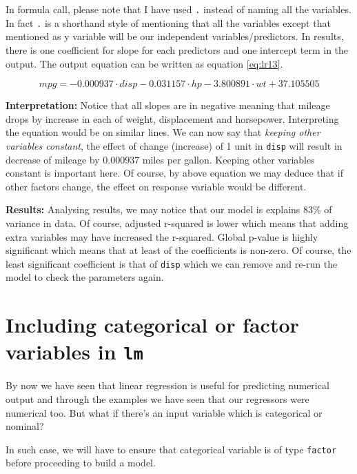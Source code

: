 \documentclass[
]{book}
\begin{document}
In formula call, please note that I have used \texttt{.} instead of naming all the variables. In fact \texttt{.} is a shorthand style of mentioning that all the variables except that mentioned as y variable will be our independent variables/predictors. In results, there is one coefficient for slope for each predictors and one intercept term in the output. The output equation can be written as equation \eqref{eq:lr13}.

\begin{equation} 
{mpg} = -0.000937\cdot{disp} - 0.031157\cdot{hp} - 3.800891\cdot{wt} + 37.105505
\label{eq:lr13}
\end{equation}

\textbf{Interpretation:} Notice that all slopes are in negative meaning that mileage drops by increase in each of weight, displacement and horsepower. Interpreting the equation would be on similar lines. We can now say that \emph{keeping other variables constant}, the effect of change (increase) of 1 unit in \texttt{disp} will result in decrease of mileage by 0.000937 miles per gallon. Keeping other variables constant is important here. Of course, by above equation we may deduce that if other factors change, the effect on response variable would be different.

\textbf{Results:} Analysing results, we may notice that our model is explains 83\% of variance in data. Of course, adjusted r-squared is lower which means that adding extra variables may have increased the r-squared. Global p-value is highly significant which means that at least of the coefficients is non-zero. Of course, the least significant coefficient is that of \texttt{disp} which we can remove and re-run the model to check the parameters again.

\hypertarget{including-categorical-or-factor-variables-in-lm}{%
\section{\texorpdfstring{Including categorical or factor variables in \texttt{lm}}{Including categorical or factor variables in lm}}\label{including-categorical-or-factor-variables-in-lm}}

By now we have seen that linear regression is useful for predicting numerical output and through the examples we have seen that our regressors were numerical too. But what if there's an input variable which is categorical or nominal?

In such case, we will have to ensure that categorical variable is of type \texttt{factor} before proceeding to build a model.
\end{document}
